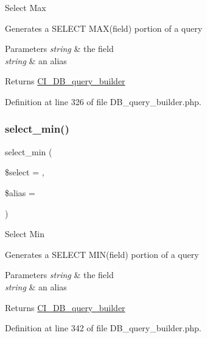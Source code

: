 Select Max

Generates a S\+E\+L\+E\+CT M\+A\+X(field) portion of a query


\begin{DoxyParams}{Parameters}
{\em string} & the field \\
\hline
{\em string} & an alias \\
\hline
\end{DoxyParams}
\begin{DoxyReturn}{Returns}
\mbox{\hyperlink{class_c_i___d_b__query__builder}{C\+I\+\_\+\+D\+B\+\_\+query\+\_\+builder}} 
\end{DoxyReturn}


Definition at line 326 of file D\+B\+\_\+query\+\_\+builder.\+php.

\mbox{\label{class_c_i___d_b__query__builder_ab8cf650dd779435da91d6f50bf082528}} 
\subsubsection{\texorpdfstring{select\_min()}{select\_min()}}
{\footnotesize\ttfamily select\+\_\+min (\begin{DoxyParamCaption}\item[{}]{\$select = {\ttfamily \textquotesingle{}\textquotesingle{}},  }\item[{}]{\$alias = {\ttfamily \textquotesingle{}\textquotesingle{}} }\end{DoxyParamCaption})}

Select Min

Generates a S\+E\+L\+E\+CT M\+I\+N(field) portion of a query


\begin{DoxyParams}{Parameters}
{\em string} & the field \\
\hline
{\em string} & an alias \\
\hline
\end{DoxyParams}
\begin{DoxyReturn}{Returns}
\mbox{\hyperlink{class_c_i___d_b__query__builder}{C\+I\+\_\+\+D\+B\+\_\+query\+\_\+builder}} 
\end{DoxyReturn}


Definition at line 342 of file D\+B\+\_\+query\+\_\+builder.\+php.

\mbox{\label{class_c_i___d_b__query__builder_a42348c349cf2fa7ca0210087efcf98d3}} 
